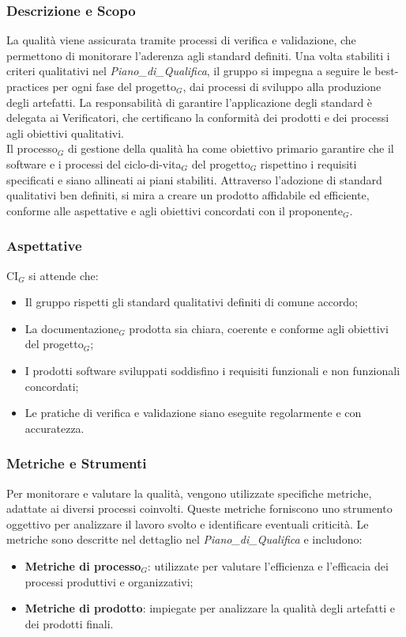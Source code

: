 \documentclass[10pt]{article}
\begin{document}
\begin{justify}
    \subsubsection{Descrizione e Scopo}
     La qualità viene assicurata tramite processi di verifica e validazione, che permettono di monitorare l'aderenza agli standard definiti. Una volta stabiliti i criteri qualitativi nel \textit{Piano\_di\_Qualifica}, il gruppo si impegna a seguire le best-practices per ogni fase del progetto$_G$, dai processi di sviluppo alla produzione degli artefatti. La responsabilità di garantire l'applicazione degli standard è delegata ai Verificatori, che certificano la conformità dei prodotti e dei processi agli obiettivi qualitativi.\\
     Il processo$_G$ di gestione della qualità ha come obiettivo primario garantire che il software e i processi del ciclo-di-vita$_G$ del progetto$_G$ rispettino i requisiti specificati e siano allineati ai piani stabiliti. Attraverso l'adozione di standard qualitativi ben definiti, si mira a creare un prodotto affidabile ed efficiente, conforme alle aspettative e agli obiettivi concordati con il proponente$_G$.
    
    \subsubsection{Aspettative}
    CI$_G$ si attende che:
    \begin{itemize}
        \item Il gruppo rispetti gli standard qualitativi definiti di comune accordo;
        \item La documentazione$_G$ prodotta sia chiara, coerente e conforme agli obiettivi del progetto$_G$;
        \item I prodotti software sviluppati soddisfino i requisiti funzionali e non funzionali concordati;
        \item Le pratiche di verifica e validazione siano eseguite regolarmente e con accuratezza.
    \end{itemize}
    
    \subsubsection{Metriche e Strumenti}
    Per monitorare e valutare la qualità, vengono utilizzate specifiche metriche, adattate ai diversi processi coinvolti. Queste metriche forniscono uno strumento oggettivo per analizzare il lavoro svolto e identificare eventuali criticità. Le metriche sono descritte nel dettaglio nel \textit{Piano\_di\_Qualifica} e includono:
    \begin{itemize}
        \item \textbf{Metriche di processo$_G$}: utilizzate per valutare l'efficienza e l'efficacia dei processi produttivi e organizzativi;
        \item \textbf{Metriche di prodotto}: impiegate per analizzare la qualità degli artefatti e dei prodotti finali.
    \end{itemize}
    

\end{justify}
\end{document}
